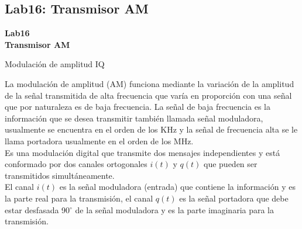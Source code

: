 \subsection{Lab16: Transmisor AM}

\begin{frame}{}


\bfseries{\textrm{\LARGE Lab16\\ \Large Transmisor AM}}
\raggedright
\end{frame}

\begin{frame}{Modulación de amplitud IQ}


La modulación de amplitud (AM) funciona mediante la variación de la amplitud de la señal transmitida de alta frecuencia que varía en proporción con una señal que por naturaleza es de baja frecuencia. La señal de baja frecuencia es la información que se desea transmitir también llamada señal moduladora, usualmente se encuentra en el orden de los KHz y la señal de frecuencia alta se le llama portadora usualmente en el orden de los MHz. \\
\vspace{2mm}
Es una modulación digital que transmite dos mensajes independientes y está conformado por dos canales ortogonales $i(t)$ y $q(t)$ que pueden ser transmitidos simultáneamente. \\ \vspace{2mm}  
El canal $i(t)$ es la señal moduladora (entrada) que contiene la información y es la parte real para la transmisión, el canal $q(t)$ es la señal portadora que debe estar desfasada 90$^{\circ}$ de la señal moduladora y es la parte imaginaria para la transmisión\cite{Lecture9}.  




\end{frame}

